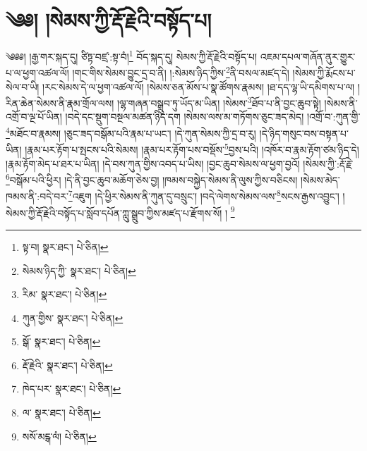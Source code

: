 \setcounter{footnote}{0} 
\chapter{༄༅། །སེམས་ཀྱི་རྡོ་རྗེའི་བསྟོད་པ།}༄༅༅། །རྒྱ་གར་སྐད་དུ། ཙིཏྟ་བཛྲ་:སྟ་བཾ།\footnote{སྟ་བ།  སྣར་ཐང་།  པེ་ཅིན། } བོད་སྐད་དུ། སེམས་ཀྱི་རྡོ་རྗེའི་བསྟོད་པ། འཇམ་དཔལ་གཞོན་ནུར་གྱུར་པ་ལ་ཕྱག་འཚལ་ལོ། །གང་གིས་སེམས་བྱུང་དྲ་བ་ནི། །:སེམས་ཉིད་ཀྱིས་\footnote{སེམས་ཉིད་ཀྱི་  སྣར་ཐང་།  པེ་ཅིན། }ནི་བསལ་མཛད་དེ། །སེམས་ཀྱི་རྨོངས་པ་སེལ་བ་ཡི། །རང་སེམས་དེ་ལ་ཕྱག་འཚལ་ལོ། །སེམས་ཅན་མོས་པ་སྣ་ཚོགས་རྣམས། །ཐ་དད་ལྷ་ཡི་དམིགས་པ་ལ། །རིན་ཆེན་སེམས་ནི་རྣམ་གྲོལ་ལས། །ལྷ་གཞན་བསྒྲུབ་ཏུ་ཡོད་མ་ཡིན། །སེམས་\footnote{རིམ་  སྣར་ཐང་།  པེ་ཅིན། }ཐོབ་པ་ནི་བྱང་ཆུབ་སྟེ། །སེམས་ནི་འགྲོ་བ་ལྔ་པོ་ཡིན། །བདེ་དང་སྡུག་བསྔལ་མཚན་ཉིད་དག །སེམས་ལས་མ་གཏོགས་ཅུང་ཟད་མེད། །འགྲོ་བ་:ཀུན་གྱི་\footnote{ཀུན་གྱིས་  སྣར་ཐང་།  པེ་ཅིན། }མཐོང་བ་རྣམས། །ཅུང་ཟད་བསྒོམ་པའི་རྣམ་པ་ཡང་། །དེ་ཀུན་སེམས་ཀྱི་དྲ་བ་རུ། །དེ་ཉིད་གསུང་བས་བསྟན་པ་ཡིན། །རྣམ་པར་རྟོག་པ་སྤངས་པའི་སེམས། །རྣམ་པར་རྟོག་པས་བསྡོས་\footnote{སྒོ་  སྣར་ཐང་།  པེ་ཅིན། }བྱས་པའི། །འཁོར་བ་རྣམ་རྟོག་ཙམ་ཉིད་དེ། །རྣམ་རྟོག་མེད་པ་ཐར་པ་ཡིན། །དེ་བས་ཀུན་གྱིས་འབད་པ་ཡིས། །བྱང་ཆུབ་སེམས་ལ་ཕྱག་བྱའོ། །སེམས་ཀྱི་:རྡོ་རྗེ་\footnote{རྡོ་རྗེའི་  སྣར་ཐང་།  པེ་ཅིན། }བསྒོམ་པའི་ཕྱིར། །དེ་ནི་བྱང་ཆུབ་མཆོག་ཅེས་བྱ། །ཁམས་བསྐྱེད་སེམས་ནི་ལུས་ཀྱིས་བཅིངས། །སེམས་མེད་ཁམས་ནི་:བདེ་བར་\footnote{ཁེད་པར་  སྣར་ཐང་།  པེ་ཅིན། }འཇུག །དེ་ཕྱིར་སེམས་ནི་ཀུན་དུ་བསྲུང་། །བདེ་ལེགས་སེམས་ལས་\footnote{ལ་  སྣར་ཐང་།  པེ་ཅིན། }སངས་རྒྱས་འབྱུང་། །སེམས་ཀྱི་རྡོ་རྗེའི་བསྟོད་པ་སློབ་དཔོན་ཀླུ་སྒྲུབ་ཀྱིས་མཛད་པ་རྫོགས་སོ། ། \footnote{སསོ་མངྒ་ལཾ།   པེ་ཅིན། }